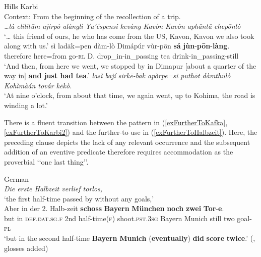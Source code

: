 {\begin{exe}
	\ex Hills Karbi\label{exFurtherToKarbi2}\\
	Context: From the beginning of the recollection of a trip.\\
	\textit{…là elilitūm ajirpò alànglì Yu’éspensi kevàng Kavòn Kavòn aphāntā chepōnlò}\\
	\lq … this friend of ours, he who has come from the US, Kavon, Kavon we also took along with us.'
	\exi{}\gll sì ladāk=pen dàm-lò Dimápúr vùr-pōn \textbf{sá} \textbf{jùn}-\textbf{pōn}-\textbf{làng}. \\
	therefore here=from go-\textsc{rl} D. drop\_in-in\_passing tea drink-in\_passing-still\\
	\glt \lq And then, from here we went, we stopped by in Dimapur [about a quarter of the way in] \textbf{and just had tea}.'
	\exi{}
	\textit{lasì bají sirkē-bāk apòrpe=si puthōt dàmthūlò Kohìmàán továr kēkò.}\\
	\lq At nine o’clock, from about that time, we again went, up to Kohima, the road is winding a lot.' \parencite[361–362]{KonnerthTisso2018}
\end{exe}

There is a fluent transition between the pattern in (\ref{exFurtherToKafka}, \ref{exFurtherToKarbi2}) and the further-to use in (\ref{exFurtherToHalbzeit}). Here, the preceding clause depicts the lack of any relevant occurrence and the subsequent addition of an eventive predicate therefore requires accommodation as the proverbial \lq\lq one last thing\rq\rq{}.

\begin{exe}
	\ex German\label{exFurtherToHalbzeit}\\
	 \textit{Die erste Halbzeit verlief torlos,}\\
	\lq the first half-time passed by without any goals,\rq{}\\
	\gll Aber in der 2. Halb-zeit \textbf{schoss} \textbf{Bayern} \textbf{München} \textbf{noch} \textbf{zwei} \textbf{Tor}-\textbf{e}.\\
	but in \textsc{def}.\textsc{dat}.\textsc{sg}.\textsc{f} 2nd half-time(\textsc{f}) shoot.\textsc{pst}.3\textsc{sg} Bayern Munich still two goal-\textsc{pl}\\
	\glt \lq but in the second half-time \textbf{Bayern} \textbf{Munich} (\textbf{eventually}) \textbf{did} \textbf{score} \textbf{twice}.' (\cite[127]{HoepelmanRohrer1980}, glosses added)
\end{exe}

}
